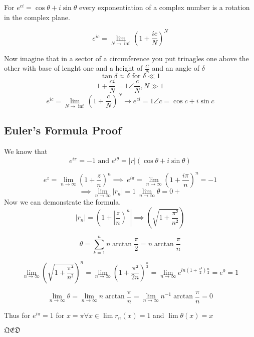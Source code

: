 \noindent For $e^{ci} = \cos{\theta} + i\sin{\theta}$ every exponentiation of a complex number is a rotation in the complex plane.

\[
	e^{ic} = \lim_{N \rightarrow \inf} \left( 1 + \frac{ic}{N}\right)^N
\]

\noindent Now imagine that in a sector of a circunference you put trinagles one above the other with base of lenght one and a height of $\frac{C}{N}$ and an angle of $\delta$
\[
	\tan{\delta} \approx \delta \text{ for } \delta \ll 1
\]
\[
	1 + \frac{ci}{N} = 1 \angle \frac{c}{N}, N \gg 1
\]
\[
	e^{ic} = \lim_{N \rightarrow \inf} \left( 1 + \frac{c}{N}\right)^N \rightarrow e^{ci} = 1 \angle c = \cos{c} + i\sin{c}
\]

\subsection{Euler's Formula Proof}
We know that
\[
	e^{i\pi} = -1 \text{ and } e^{i\theta} = |r|(\cos{\theta} + i\sin{\theta})
\]

\[
	e^{z} = \lim_{n \rightarrow \infty} \left( 1 + \frac{z}{n}\right)^n \implies\ e^{i\pi} = \lim_{n \rightarrow \infty} \left( 1 + \frac{i\pi}{n}\right)^n = -1
\]
\[
	\implies \lim_{n \rightarrow \infty} |r_n| = 1\ \lim_{n \rightarrow \infty} \theta = 0+
\]
\noindent Now we can demonstrate the formula.
\[
	|r_n| = \left( 1 + \left|\frac{z}{n}\right)^n\right| \implies \left( \sqrt{1 + \frac{\pi²}{n²}}\right)
\]

\[
	\theta = \sum_{k = 1}^{n} n \arctan \frac{\pi}{2} = n \arctan \frac{\pi}{n}
\]

\[
	\lim_{n \rightarrow \infty} \left( \sqrt{1 + \frac{\pi²}{n²}}\right)^n = \lim_{n \rightarrow \infty} \left( 1 + \frac{\pi²}{2n}\right)^\frac{n}{2}
	= \lim_{n \rightarrow \infty} e^{ln\left(1 +\frac{\pi²}{2}\right) \frac{n}{2}} = e^0 = 1
\]

\[
	\lim_{n \rightarrow \infty} \theta = \lim_{n \rightarrow \infty} n \arctan \frac{\pi}{n} = \lim_{n \rightarrow \infty} n^{-1} \arctan\frac{\pi}{n} = 0
\]

Thus for $e^{i\pi} = 1$ for $x = \pi \forall x \in \lim r_n (x) = 1$ and $ \lim \theta (x) = x$

$\mathfrak{QED}$

\newpage